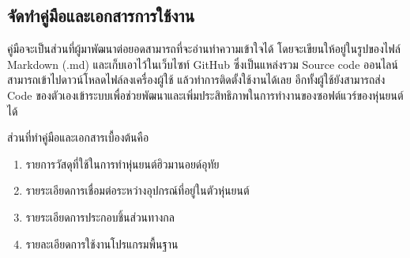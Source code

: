 
\clearpage
\subsection{จัดทำคู่มือและเอกสารการใช้งาน}
คู่มือจะเป็นส่วนที่ผู้มาพัฒนาต่อยอดสามารถที่จะอ่านทำความเข้าใจได้ โดยจะเขียนให้อยู่ในรูปของไฟล์ 
Markdown (.md) และเก็บเอาไว้ในเว็บไซท์ GitHub ซึ่งเป็นแหล่งรวม Source code ออนไลน์
สามารถเข้าไปดาวน์โหลดไฟล์ลงเครื่องผู้ใช้ แล้วทำการติดตั้งใช้งานได้เลย อีกทั้งผู้ใช้ยังสามารถส่ง Code
ของตัวเองเข้าระบบเพื่อช่วยพัฒนาและเพิ่มประสิทธิภาพในการทำงานของซอฟต์แวร์ของหุ่นยนต์ได้

ส่วนที่ทำคู่มือและเอกสารเบื้องต้นคือ\vspace{-5mm}
\begin{enumerate}[label=\arabic*, leftmargin=1.5cm]\setlength\itemsep{-0.25em}
	\item รายการวัสดุที่ใช้ในการทำหุ่นยนต์ฮิวมานอยด์อุทัย
	\item รายระเอียดการเชื่อมต่อระหว่างอุปกรณ์ที่อยู่ในตัวหุ่นยนต์
	\item รายระเอียดการประกอบชิ้นส่วนทางกล
	\item รายละเอียดการใช้งานโปรแกรมพื้นฐาน
\end{enumerate}

